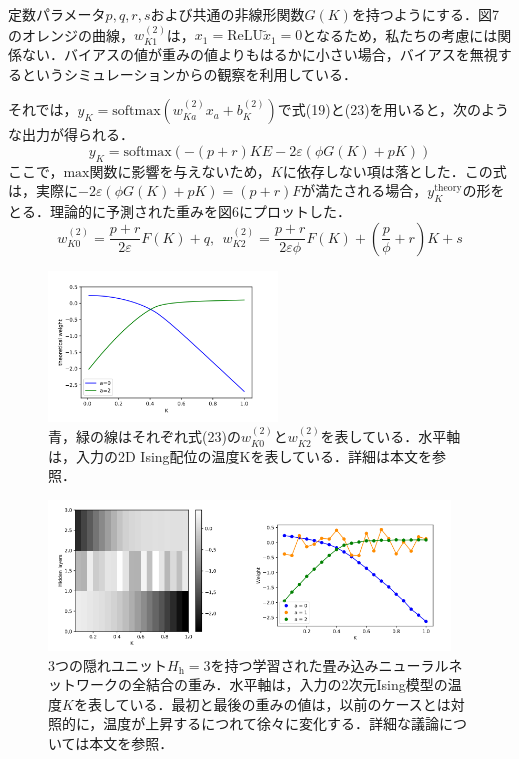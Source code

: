 \documentclass[a4paper,11pt]{jsarticle}
\begin{document}
定数パラメータ$p,q,r,s$および共通の非線形関数$G(K)$を持つようにする．図7のオレンジの曲線，$w^(2)_{K1}$は，$x_1 = \text{ReLU}\tilde{x}_1 = 0$となるため，私たちの考慮には関係ない．バイアスの値が重みの値よりもはるかに小さい場合，バイアスを無視するというシミュレーションからの観察を利用している．\par
それでは，$y_K = \text{softmax}(w_{Ka}^{(2)}x_a + b_K^{(2)})$で式(19)と(23)を用いると，次のような出力が得られる．
\begin{equation}
  y_K = \text{softmax}(-(p+r)KE - 2\varepsilon(\phi G(K) + pK))
\end{equation}
ここで，$\text{max}$関数に影響を与えないため，$K$に依存しない項は落とした．この式は，実際に$-2\varepsilon (\phi G(K) + pK) = (p + r)F$が満たされる場合，$y_K^{\text{theory}}$の形をとる．理論的に予測された重みを図6にプロットした．
\begin{equation}
  w_{K0}^{(2)} = \frac{p+r}{2\varepsilon}F(K) + q, \ \
  w_{K2}^{(2)} = \frac{p+r}{2\varepsilon \phi}F(K) + \left( \frac{p}{\phi} + r \right)K + s
\end{equation}
\begin{figure}
  \begin{center}
    \includegraphics[height=4cm]{image/Figure6.png}
    \caption{青，緑の線はそれぞれ式(23)の$w_{K0}^{(2)}$と$w_{K2}^{(2)}$を表している．水平軸は，入力の2D Ising配位の温度Kを表している．詳細は本文を参照．}
  \end{center}
\end{figure}
\begin{figure}
  \begin{center}
    \includegraphics[height=4cm]{image/Figure7.png}
    \caption{3つの隠れユニット$H_{\text{h}}=3$を持つ学習された畳み込みニューラルネットワークの全結合の重み．水平軸は，入力の2次元Ising模型の温度$K$を表している．最初と最後の重みの値は，以前のケースとは対照的に，温度が上昇するにつれて徐々に変化する．詳細な議論については本文を参照．}
  \end{center}
\end{figure}
\end{document}

